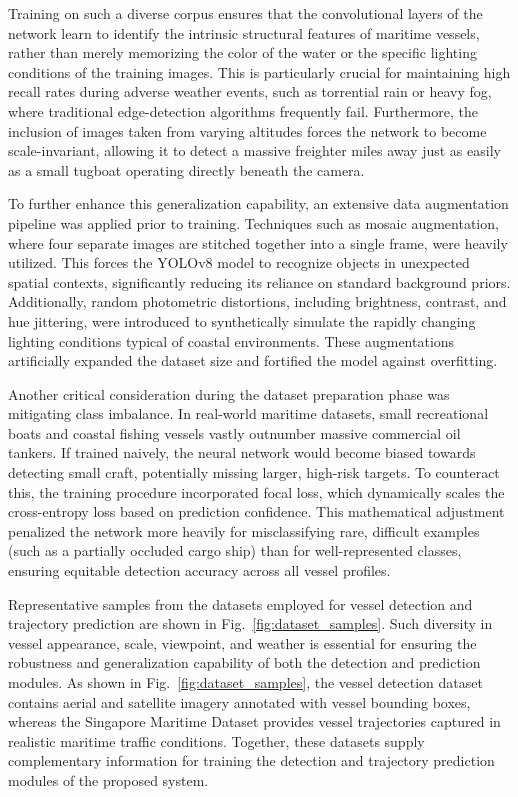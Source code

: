 Training on such a diverse corpus ensures that the convolutional layers of the network learn to identify the intrinsic structural features of maritime vessels, rather than merely memorizing the color of the water or the specific lighting conditions of the training images. This is particularly crucial for maintaining high recall rates during adverse weather events, such as torrential rain or heavy fog, where traditional edge-detection algorithms frequently fail. Furthermore, the inclusion of images taken from varying altitudes forces the network to become scale-invariant, allowing it to detect a massive freighter miles away just as easily as a small tugboat operating directly beneath the camera.

To further enhance this generalization capability, an extensive data augmentation pipeline was applied prior to training. Techniques such as mosaic augmentation, where four separate images are stitched together into a single frame, were heavily utilized. This forces the YOLOv8 model to recognize objects in unexpected spatial contexts, significantly reducing its reliance on standard background priors. Additionally, random photometric distortions, including brightness, contrast, and hue jittering, were introduced to synthetically simulate the rapidly changing lighting conditions typical of coastal environments. These augmentations artificially expanded the dataset size and fortified the model against overfitting.

Another critical consideration during the dataset preparation phase was mitigating class imbalance. In real-world maritime datasets, small recreational boats and coastal fishing vessels vastly outnumber massive commercial oil tankers. If trained naively, the neural network would become biased towards detecting small craft, potentially missing larger, high-risk targets. To counteract this, the training procedure incorporated focal loss, which dynamically scales the cross-entropy loss based on prediction confidence. This mathematical adjustment penalized the network more heavily for misclassifying rare, difficult examples (such as a partially occluded cargo ship) than for well-represented classes, ensuring equitable detection accuracy across all vessel profiles.
\begin{reportfigblock}
Representative samples from the datasets employed for vessel detection and trajectory prediction are shown in Fig.~\ref{fig:dataset_samples}. Such diversity in vessel appearance, scale, viewpoint, and weather is essential for ensuring the robustness and generalization capability of both the detection and prediction modules.
As shown in Fig.~\ref{fig:dataset_samples}, the vessel detection dataset contains aerial and satellite imagery annotated with vessel bounding boxes, whereas the Singapore Maritime Dataset provides vessel trajectories captured in realistic maritime traffic conditions. Together, these datasets supply complementary information for training the detection and trajectory prediction modules of the proposed system.
\end{reportfigblock}

